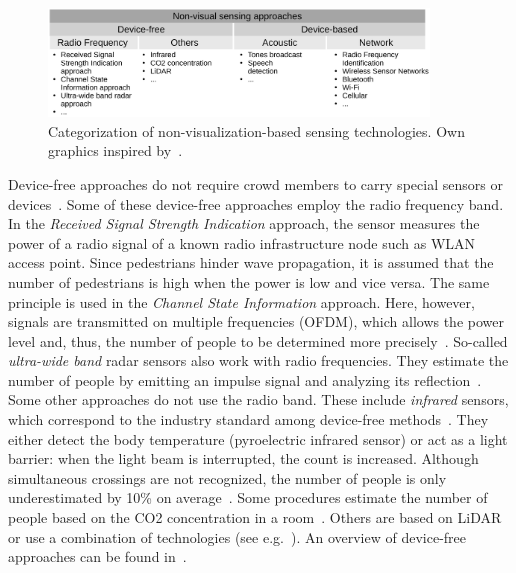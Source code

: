 \begin{figure}[hbt!]
\centering
\includegraphics[width=0.9\textwidth]{../figures/state-of-the-art/crowdmanagement/sensing_nonvisual.pdf} 
\caption[]{Categorization of non-visualization-based sensing technologies. Own \mbox{graphics} inspired by~\cite{kouyoumdjieva-2019-cdyn}.  }
\label{fig:classification}
\end{figure}
%



Device-free approaches do not require crowd members to carry special sensors or devices~\cite{kouyoumdjieva-2019-cdyn}. Some of these device-free approaches employ the radio frequency band. In the \textit{Received Signal Strength Indication} approach, the sensor measures the power of a radio signal of a known radio infrastructure node such as WLAN access point. Since pedestrians hinder wave propagation, it is assumed that the number of pedestrians is high when the power is low and vice versa. The same principle is used in the \textit{Channel State Information} approach. Here, however, signals are transmitted on multiple frequencies (OFDM), which allows the power level and, thus, the number of people to be determined more precisely~\cite{wu-2012-com}.
So-called \textit{ultra-wide band} radar sensors also work with radio frequencies. They estimate the number of people by emitting an impulse signal and analyzing its reflection~\cite{choi-2017-com}. 
%
Some other approaches do not use the radio band. These include \textit{infrared} sensors, which correspond to the industry standard among device-free methods~\cite{kouyoumdjieva-2019-cdyn}. They either detect the body temperature (pyroelectric infrared sensor) or act as a light barrier: when the light beam is interrupted, the count is increased. Although simultaneous crossings are not recognized, the number of people is only underestimated by 10\% on average~\cite{olivo-2019-cdyn}. Some procedures estimate the number of people based on the CO2 concentration in a room~\cite{lei-2021-cdyn}. Others are based on LiDAR or use a combination of technologies (see e.g.~\cite{leykin-2010-cdyn}).
An overview of device-free approaches can be found in~\cite{kouyoumdjieva-2019-cdyn}.






